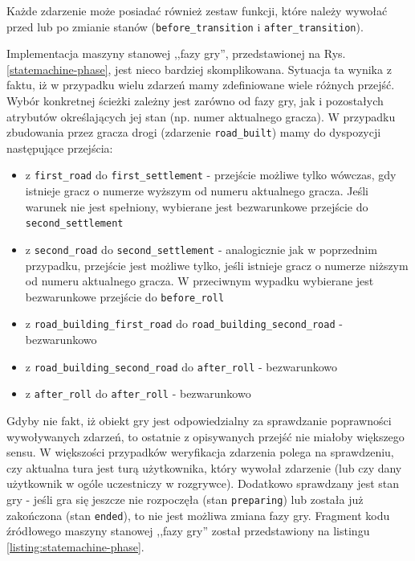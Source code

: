 \documentclass[11pt,twoside]{report}
\providecommand{\imref}[1]{Rys. \ref{#1}} %
\begin{document}
Każde zdarzenie może posiadać również zestaw funkcji, które należy
wywołać przed lub po zmianie stanów (\texttt{before\_transition} i
\texttt{after\_transition}).

Implementacja maszyny stanowej ,,fazy gry'', przedstawionej na
\imref{statemachine-phase}, jest nieco bardziej
skomplikowana. Sytuacja ta wynika z faktu, iż w przypadku wielu
zdarzeń mamy zdefiniowane wiele różnych przejść. Wybór konkretnej
ścieżki zależny jest zarówno od fazy gry, jak i pozostałych atrybutów
określających jej stan (np. numer aktualnego gracza). W przypadku
zbudowania przez gracza drogi (zdarzenie \texttt{road\_built}) mamy do
dyspozycji następujące przejścia:

\begin{itemize}
\item z \texttt{first\_road} do \texttt{first\_settlement} - przejście
  możliwe tylko wówczas, gdy istnieje gracz o numerze wyższym od
  numeru aktualnego gracza. Jeśli warunek nie jest spełniony,
  wybierane jest bezwarunkowe przejście do \texttt{second\_settlement}
\item z \texttt{second\_road} do \texttt{second\_settlement} -
  analogicznie jak w poprzednim przypadku, przejście jest możliwe tylko,
  jeśli istnieje gracz o numerze niższym od numeru aktualnego
  gracza. W przeciwnym wypadku wybierane jest bezwarunkowe przejście
  do \texttt{before\_roll}
\item z \texttt{road\_building\_first\_road} do
  \texttt{road\_building\_second\_road} - bezwarunkowo
\item z \texttt{road\_building\_second\_road} do \texttt{after\_roll}
  - bezwarunkowo
\item z \texttt{after\_roll} do \texttt{after\_roll} - bezwarunkowo
\end{itemize}

Gdyby nie fakt, iż obiekt gry jest odpowiedzialny za sprawdzanie
poprawności wywoływanych zdarzeń, to ostatnie z opisywanych przejść
nie miałoby większego sensu. W większości przypadków weryfikacja
zdarzenia polega na sprawdzeniu, czy aktualna tura jest turą
użytkownika, który wywołał zdarzenie (lub czy dany użytkownik w ogóle
uczestniczy w rozgrywce). Dodatkowo sprawdzany jest stan gry - jeśli
gra się jeszcze nie rozpoczęła (stan \texttt{preparing}) lub została
już zakończona (stan \texttt{ended}), to nie jest możliwa zmiana fazy
gry. Fragment kodu źródłowego maszyny stanowej ,,fazy gry'' został
przedstawiony na listingu \ref{listing:statemachine-phase}.
\end{document}

